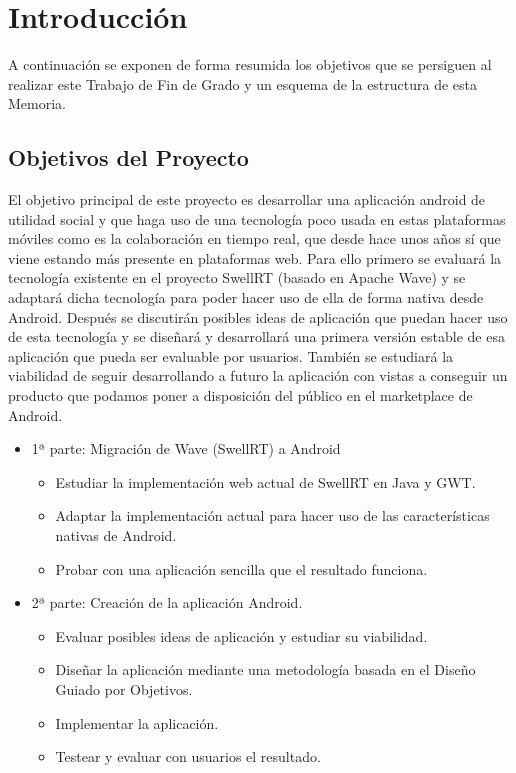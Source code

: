 \newpage
\thispagestyle{sectioned}
\chapter{Introducción}

A continuación se exponen de forma resumida los objetivos que se persiguen al realizar este Trabajo de Fin de Grado y un esquema de la estructura de esta Memoria.
 
\section{Objetivos del Proyecto}

El objetivo principal de este proyecto es desarrollar una aplicación android de utilidad social y que haga uso de una tecnología poco usada en estas plataformas móviles como es la colaboración en tiempo real, que desde hace unos años sí que viene estando más presente en plataformas web. Para ello primero se evaluará la tecnología existente en el proyecto SwellRT (basado en Apache Wave) y se adaptará dicha tecnología para poder hacer uso de ella de forma nativa desde Android. Después se discutirán posibles ideas de aplicación que puedan hacer uso de esta tecnología y se diseñará y desarrollará una primera versión estable de esa aplicación que pueda ser evaluable por usuarios. También se estudiará la viabilidad de seguir desarrollando a futuro la aplicación con vistas a conseguir un producto que podamos poner a disposición del público en el marketplace de Android.

\begin{itemize}
  \item {
    1ª parte: Migración de Wave (SwellRT) a Android
    \begin{itemize}
      \item Estudiar la implementación web actual de SwellRT en Java y GWT.
      \item Adaptar la implementación actual para hacer uso de las características nativas de Android.
      \item Probar con una aplicación sencilla que el resultado funciona.
    \end{itemize}
  }
  \item {
    2ª parte: Creación de la aplicación Android.
    \begin{itemize}
      \item Evaluar posibles ideas de aplicación y estudiar su viabilidad.
      \item Diseñar la aplicación mediante una metodología basada en el Diseño Guiado por Objetivos.
      \item Implementar la aplicación.
      \item Testear y evaluar con usuarios el resultado.
    \end{itemize}
  }
\end{itemize}


